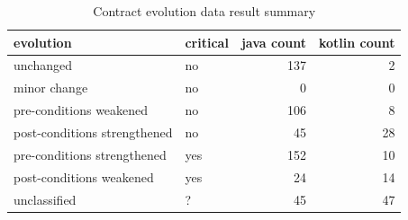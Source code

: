 \begin{table}[]
\centering
\caption{Contract evolution data result summary}
\label{tab:results-evolution}
\begin{tabular}{|l|l|r|r|} \hline
   evolution & critical & java count & kotlin count \\ \hline
   unchanged & no & 137 & 2  \\
   minor change & no & 0 & 0  \\
   pre-conditions weakened & no & 106 & 8  \\
   post-conditions strengthened & no & 45 & 28  \\ \hline
   pre-conditions strengthened & yes & 152 & 10  \\
   post-conditions weakened & yes & 24 & 14  \\ \hline
   unclassified & ? & 45 & 47  \\ \hline
\end{tabular}
\end{table}
